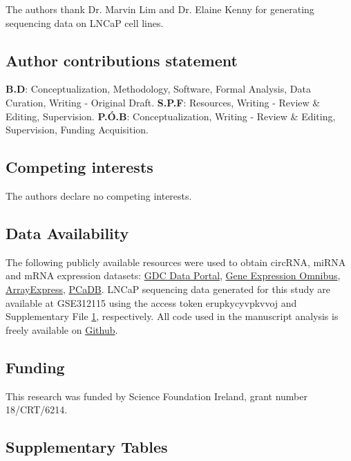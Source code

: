 The authors thank Dr. Marvin Lim and Dr. Elaine Kenny for generating sequencing data on LNCaP cell lines.

\subsection*{Author contributions statement}

\textbf{B.D}: Conceptualization, Methodology, Software, Formal Analysis, Data Curation, Writing - Original Draft. \textbf{S.P.F}: Resources, Writing - Review \& Editing, Supervision. \textbf{P.\'{O}.B}: Conceptualization, Writing - Review \& Editing, Supervision, Funding Acquisition.


\subsection*{Competing interests}
The authors declare no competing interests.

\subsection*{Data Availability}
The following publicly available resources were used to obtain circRNA, miRNA and mRNA expression datasets: \href{https://portal.gdc.cancer.gov}{GDC Data Portal}, \href{https://www.ncbi.nlm.nih.gov/geo}{Gene Expression Omnibus}, \href{https://www.ebi.ac.uk/biostudies/arrayexpress}{ArrayExpress}, \href{http://bioinfo.jialab-ucr.org/PCaDB/}{PCaDB}. LNCaP sequencing data generated for this study are available at GSE312115 using the access token erupkycyvpkvvoj and Supplementary File \hyperlink{chp4suppfile1}{1}, respectively. All code used in the manuscript analysis is freely available on \href{https://github.com/BarryDigby/pca_network}{Github}.

\subsection*{Funding}
This research was funded by Science Foundation Ireland, grant number 18/CRT/6214.


\subsection{Supplementary Tables}

\renewcommand{\thefigure}{\chapternum.S\arabic{figure}}
\setcounter{figure}{0}

\renewcommand{\thetable}{\chapternum.S\arabic{table}}
\setcounter{table}{0}


